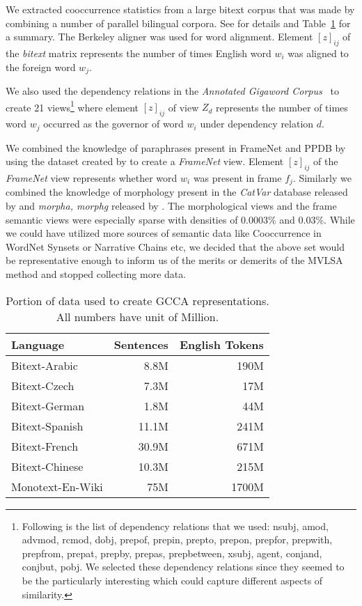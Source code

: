 \documentclass[11pt]{article}
\newcommand{\xline}[0]{\noindent\underline{\makebox[0.1cm][l]{}}}
\begin{document}
We extracted cooccurrence statistics from a large bitext corpus that was made by combining a
number of parallel bilingual corpora. See \cite{ganitkevitch2013ppdb} for details and
Table~\ref{tab:dataperlang} for a summary. The Berkeley aligner was used for word alignment. Element
$[z]_{ij}$ of the \textit{bitext} matrix represents the number of times English
word $w_i$ was aligned to the foreign word $w_j$.

We also used the dependency relations in the \textit{Annotated
  Gigaword Corpus}~\cite{annotatedGigaword12} to create 21
views\footnote{Following is the list of dependency relations that we
  used: nsubj, amod, advmod, rcmod, dobj, prep\xline{}of,
  prep\xline{}in, prep\xline{}to, prep\xline{}on, prep\xline{}for,
  prep\xline{}with, prep\xline{}from, prep\xline{}at, prep\xline{}by,
  prep\xline{}as, prep\xline{}between, xsubj, agent, conj\xline{}and,
  conj\xline{}but, pobj. We selected these dependency relations since
  they seemed to be the particularly interesting which could capture
  different aspects of similarity.}  where element $[z]_{ij}$ of view
$Z_d$ represents the number of times word $w_j$ occurred
as the governor of word $w_i$ under dependency relation $d$.

We combined the knowledge of paraphrases present in FrameNet and PPDB by
using the dataset created by  to create a
\textit{FrameNet} view. Element $[z]_{ij}$ of the \textit{FrameNet}
view represents whether word $w_i$ was present in frame
$f_j$. Similarly we combined the knowledge of morphology present in
the \textit{CatVar} database released by  and
\textit{morpha, morphg} released by .
The morphological views and the frame semantic views were especially
sparse with densities of 0.0003\% and 0.03\%. While we could have utilized more sources of semantic data like
Cooccurrence in WordNet Synsets or Narrative Chains etc, we decided
that the above set would be representative enough to inform us of the
merits or demerits of the MVLSA method and stopped collecting more data.

\begin{table}[htbp]
  \centering
  \begin{tabular}{lrr}
    Language & Sentences & English Tokens \\
    \hline
    Bitext-Arabic   & 8.8M   & 190M  \\
    Bitext-Czech    & 7.3M   & 17M   \\
    Bitext-German   & 1.8M   & 44M   \\
    Bitext-Spanish  & 11.1M  & 241M  \\
    Bitext-French   & 30.9M  & 671M  \\
    Bitext-Chinese  & 10.3M  & 215M  \\
    Monotext-En-Wiki& 75M    & 1700M 
  \end{tabular}  
  \caption{Portion of data used to create GCCA representations. All
    numbers have unit of Million.}
  \label{tab:dataperlang}
\end{table}
\end{document}
